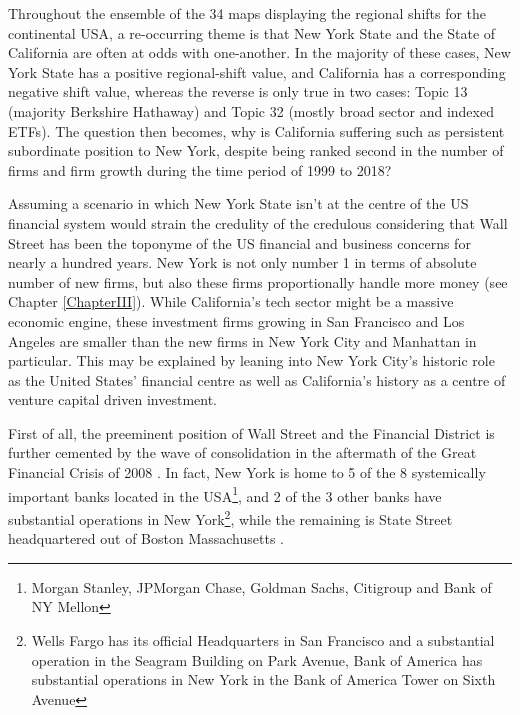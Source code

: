 Throughout the ensemble of the 34 maps displaying the regional shifts for the continental USA, a re-occurring theme is that New York State and the State of California are often at odds with one-another. In the majority of these cases, New York State has a positive regional-shift value, and California has a corresponding negative shift value, whereas the reverse is only true in two cases: Topic 13 (majority Berkshire Hathaway) and Topic 32 (mostly broad sector and indexed ETFs).   The question then becomes, why is California suffering such as persistent subordinate position to New York, despite being ranked second in the number of firms and firm growth during the time period of 1999 to 2018?  

Assuming a scenario in which New York State isn't at the centre of the US financial system would strain the credulity of the credulous considering that Wall Street has been the toponyme of the US financial and business concerns for nearly a hundred years.  New York is not only number 1 in terms of absolute number of new firms, but also these firms proportionally handle more money (see Chapter \ref{ChapterIII}).  While California's tech sector might be a massive economic engine, these investment firms growing in San Francisco and Los Angeles are smaller than the new firms in New York City and Manhattan in particular. This may be explained by leaning into New York City's historic role as the United States' financial centre as well as California's history as a centre of venture capital driven investment.  

First of all, the preeminent position of Wall Street and the Financial District is further cemented by the wave of consolidation in the aftermath of the Great Financial Crisis of 2008 \citep{wheelock2011banking}. In fact, New York is home to 5 of the 8 systemically important banks located in the USA\footnote{Morgan Stanley, JPMorgan Chase, Goldman Sachs, Citigroup and Bank of NY Mellon}, and 2 of the 3 other banks have substantial operations in New York\footnote{Wells Fargo has its official Headquarters in San Francisco and a substantial operation in the Seagram Building on Park Avenue,  Bank of America has substantial operations in New York in the Bank of America Tower on Sixth Avenue}, while the remaining is State Street headquartered out of Boston Massachusetts \citep{FSB2019}. 


